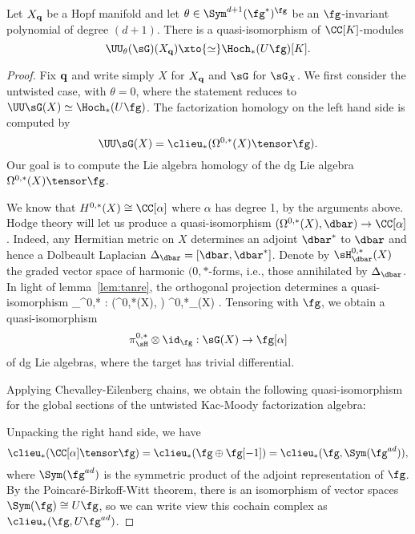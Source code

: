 \begin{prop}
\label{prop: hopf}
Let $X_{\bf q}$ be a Hopf manifold and let $\theta \in \Sym^{d+1}(\fg^*)^\fg$ be an $\fg$-invariant polynomial of degree $(d+1)$. 
There is a quasi-isomorphism of $\CC[K]$-modules
\[
\UU_\theta (\sG) (X_{\bf q}) \xto{\simeq} \Hoch_*(U \fg)[K] .
\]
\end{prop}

\begin{proof}
Fix ${\bf q}$ and write simply $X$ for $X_{\bf q}$ and $\sG$ for $\sG_X$. 
We first consider the untwisted case, with $\theta = 0$, where the statement reduces to $\UU\sG(X) \simeq \Hoch_*(U \fg)$.
The factorization homology on the left hand side is computed by
\[
\UU \sG (X) = \clieu_*(\Omega^{0,*}(X) \tensor \fg) .
\]
Our goal is to compute the Lie algebra homology of the dg Lie algebra $\Omega^{0,*}(X) \tensor \fg$.  

We know that $H^{0,*}(X) \cong \CC[\alpha]$ where $\alpha$ has degree 1, by the arguments above.
Hodge theory will let us produce a quasi-isomorphism $(\Omega^{0,*}(X), \dbar) \to \CC[\alpha]$.
Indeed, any Hermitian metric on $X$ determines an adjoint $\dbar^*$ to $\dbar$ and hence a Dolbeault Laplacian $\Delta_{\dbar} = [\dbar,\dbar^*]$.
Denote by $\sH^{0,*}_{\dbar}(X)$ the graded vector space of harmonic $(0,*$-forms, i.e., those annihilated by $\Delta_{\dbar}$. 
In light of lemma~\ref{lem:tanre}, the orthogonal projection determines a quasi-isomorphism
\beqn\label{hopfquasi}
\pi_{\sH}^{0,*} : \left(\Omega^{0,*}(X), \dbar \right) \xto{\simeq} \sH^{0,*}_{\dbar}(X) \cong \CC[\alpha].
\eeqn
Tensoring with $\fg$, we obtain a quasi-isomorphism 
\[
\pi_{\sH}^{0,*} \otimes \id_\fg :\sG (X) \to \fg[\alpha]
\]
of dg Lie algebras, where the target has trivial differential.



Applying Chevalley-Eilenberg chains, we obtain the following quasi-isomorphism for the global sections of the untwisted Kac-Moody factorization algebra:
\beqn\label{hopfquasi3}
\eeqn
Unpacking the right hand side, we have
\[
\clieu_*(\CC[\alpha] \tensor \fg) = \clieu_*(\fg \oplus \fg[-1]) = \clieu_*(\fg, \Sym (\fg^{ad})),
\] 
where $\Sym(\fg^{ad})$ is the symmetric product of the adjoint representation of $\fg$. 
By the Poincar\'{e}-Birkoff-Witt theorem, there is an isomorphism of vector spaces $\Sym(\fg) \cong U \fg$, so we can write view this cochain complex as~$\clieu_*(\fg, U \fg^{ad})$.


\end{proof}
